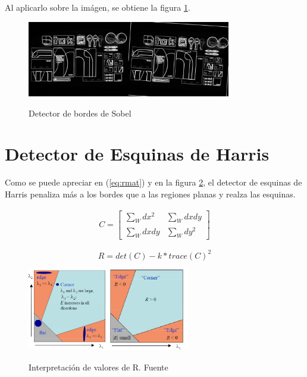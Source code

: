 \documentclass{IEEEtran}
\begin{document}
Al aplicarlo sobre la imágen, se obtiene la figura \ref{fig:sobel}.

\begin{figure}[H]
\caption{Detector de bordes de Sobel}
\centering
\includegraphics[width=8.9cm,natwidth=1200,natheight=450]{figs/sobel.png}
\label{fig:sobel}
\end{figure} 


\section{Detector de Esquinas de Harris}
Como se puede apreciar en (\ref{eq:rmat}) y en la figura \ref{fig:rmat}, el 
detector de esquinas de Harris penaliza más a los bordes que a las 
regiones planas y realza las esquinas.

\begin{equation*}
\begin{aligned}
C =\begin{bmatrix} \displaystyle\sum_W dx^2 & \displaystyle\sum_W dx dy \\
				   \displaystyle\sum_W dx dy & \displaystyle\sum_W dy^2 \end{bmatrix}
\end{aligned}
\end{equation*} 

\begin{equation}
R = det(C) - k*trace(C)^2
\label{eq:rmat}
\end{equation} 

\begin{figure}[H]
\caption{Interpretación de valores de R. Fuente \cite{cornerdetection}}
\centering
\includegraphics[width=7.1cm,natwidth=1024,natheight=519]{figs/rmat.jpg}
\label{fig:rmat}
\end{figure}
\end{document}
